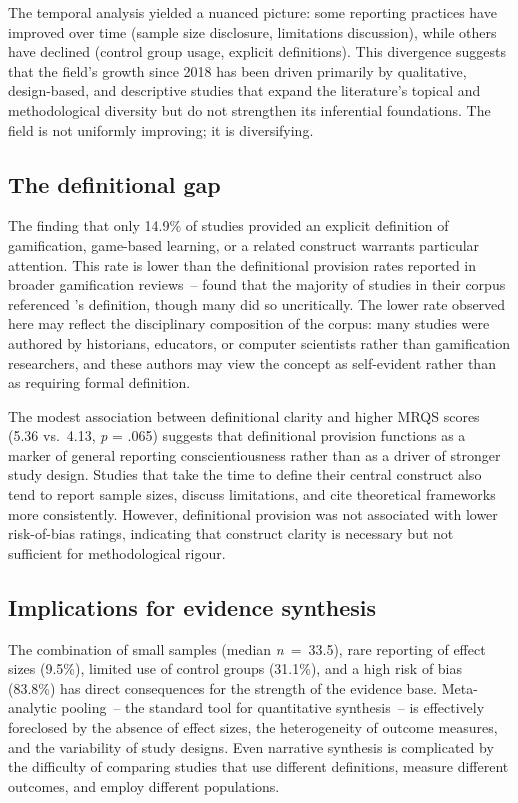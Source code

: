 \documentclass[etq]{acnsart}
\begin{document}
	The temporal analysis yielded a nuanced picture: some reporting practices have improved over time (sample size disclosure, limitations discussion), while others have declined (control group usage, explicit definitions). This divergence suggests that the field's growth since 2018 has been driven primarily by qualitative, design-based, and descriptive studies that expand the literature's topical and methodological diversity but do not strengthen its inferential foundations. The field is not uniformly improving; it is diversifying.
	
	\subsection{The definitional gap}
	\label{sec:discussion_definitions}
	
	The finding that only 14.9\% of studies provided an explicit definition of gamification, game-based learning, or a related construct warrants particular attention. This rate is lower than the definitional provision rates reported in broader gamification reviews~-- \citet{KoivistoHamari2019} found that the majority of studies in their corpus referenced \citeauthor{Deterding2011}'s \cite{Deterding2011} definition, though many did so uncritically. The lower rate observed here may reflect the disciplinary composition of the corpus: many studies were authored by historians, educators, or computer scientists rather than gamification researchers, and these authors may view the concept as self-evident rather than as requiring formal definition.
	
	The modest association between definitional clarity and higher MRQS scores (5.36 vs.\ 4.13, \textit{p} = .065) suggests that definitional provision functions as a marker of general reporting conscientiousness rather than as a driver of stronger study design. Studies that take the time to define their central construct also tend to report sample sizes, discuss limitations, and cite theoretical frameworks more consistently. However, definitional provision was not associated with lower risk-of-bias ratings, indicating that construct clarity is necessary but not sufficient for methodological rigour.
	
	\subsection{Implications for evidence synthesis}
	\label{sec:discussion_synthesis}
	
	The combination of small samples (median \textit{n}~=~33.5), rare reporting of effect sizes (9.5\%), limited use of control groups (31.1\%), and a high risk of bias (83.8\%) has direct consequences for the strength of the evidence base. Meta-analytic pooling~-- the standard tool for quantitative synthesis~-- is effectively foreclosed by the absence of effect sizes, the heterogeneity of outcome measures, and the variability of study designs. Even narrative synthesis is complicated by the difficulty of comparing studies that use different definitions, measure different outcomes, and employ different populations.
	
\end{document}
